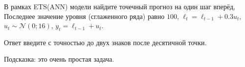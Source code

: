 
\begin{question}
В рамках ETS(ANN) модели найдите точечный прогноз на один шаг вперёд,
Последнее значение уровня (сглаженного ряда) равно \(100\), \(\ell_t = \ell_{t-1} + 0.3 u_t\),
\(u_t \sim \mathcal{N}(0; 16)\), \(y_t = \ell_{t-1} + u_t\).

Ответ введите с точностью до двух знаков после десятичной точки.
\end{question}

\begin{solution}
Подсказка: это очень простая задача.
\end{solution}

